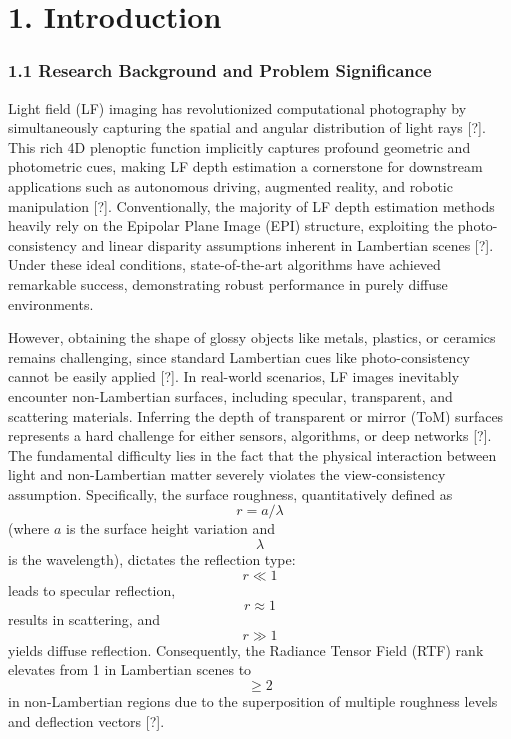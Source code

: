 \section{1. Introduction}

\subsubsection{1.1 Research Background and Problem Significance}

Light field (LF) imaging has revolutionized computational photography by simultaneously capturing the spatial and angular distribution of light rays [?]. This rich 4D plenoptic function implicitly captures profound geometric and photometric cues, making LF depth estimation a cornerstone for downstream applications such as autonomous driving, augmented reality, and robotic manipulation [?]. Conventionally, the majority of LF depth estimation methods heavily rely on the Epipolar Plane Image (EPI) structure, exploiting the photo-consistency and linear disparity assumptions inherent in Lambertian scenes [?]. Under these ideal conditions, state-of-the-art algorithms have achieved remarkable success, demonstrating robust performance in purely diffuse environments.

However, obtaining the shape of glossy objects like metals, plastics, or ceramics remains challenging, since standard Lambertian cues like photo-consistency cannot be easily applied [?]. In real-world scenarios, LF images inevitably encounter non-Lambertian surfaces, including specular, transparent, and scattering materials. Inferring the depth of transparent or mirror (ToM) surfaces represents a hard challenge for either sensors, algorithms, or deep networks [?]. The fundamental difficulty lies in the fact that the physical interaction between light and non-Lambertian matter severely violates the view-consistency assumption. Specifically, the surface roughness, quantitatively defined as \[
r = a/\lambda
\] (where \(a\) is the surface height variation and \[
\lambda
\] is the wavelength), dictates the reflection type: \[
r \ll 1
\] leads to specular reflection, \[
r \approx 1
\] results in scattering, and \[
r \gg 1
\] yields diffuse reflection. Consequently, the Radiance Tensor Field (RTF) rank elevates from 1 in Lambertian scenes to \[
\geq 2
\] in non-Lambertian regions due to the superposition of multiple roughness levels and deflection vectors [?].

